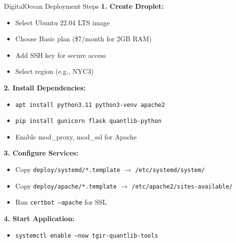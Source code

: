 \documentclass[aspectratio=169,11pt]{beamer}
\begin{document}
\begin{frame}{DigitalOcean Deployment Steps}
\textbf{1. Create Droplet:}
\begin{itemize}
    \item Select Ubuntu 22.04 LTS image
    \item Choose Basic plan (\$7/month for 2GB RAM)
    \item Add SSH key for secure access
    \item Select region (e.g., NYC3)
\end{itemize}

\textbf{2. Install Dependencies:}
\begin{itemize}
    \item \texttt{apt install python3.11 python3-venv apache2}
    \item \texttt{pip install gunicorn flask quantlib-python}
    \item Enable mod\_proxy, mod\_ssl for Apache
\end{itemize}

\textbf{3. Configure Services:}
\begin{itemize}
    \item Copy \texttt{deploy/systemd/*.template} $\to$ \texttt{/etc/systemd/system/}
    \item Copy \texttt{deploy/apache/*.template} $\to$ \texttt{/etc/apache2/sites-available/}
    \item Run \texttt{certbot --apache} for SSL
\end{itemize}

\textbf{4. Start Application:}
\begin{itemize}
    \item \texttt{systemctl enable --now tgir-quantlib-tools}
\end{itemize}
\end{frame}
\end{document}
